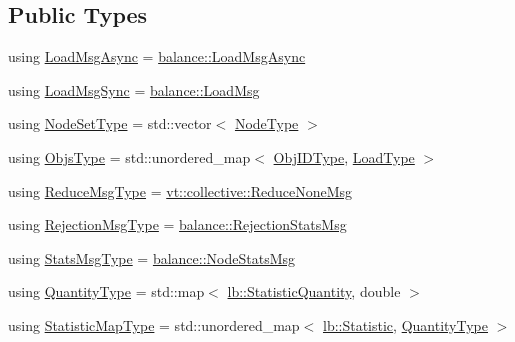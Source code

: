 \subsection*{Public Types}
\begin{DoxyCompactItemize}
\item 
using \hyperlink{structvt_1_1vrt_1_1collection_1_1lb_1_1_tempered_l_b_a38d9ad7e92612cdbdf564b6f49b516a7}{Load\+Msg\+Async} = \hyperlink{structvt_1_1vrt_1_1collection_1_1balance_1_1_load_msg_async}{balance\+::\+Load\+Msg\+Async}
\item 
using \hyperlink{structvt_1_1vrt_1_1collection_1_1lb_1_1_tempered_l_b_aa46eb8cbc4c505f35b970f75e38b5e0d}{Load\+Msg\+Sync} = \hyperlink{structvt_1_1vrt_1_1collection_1_1balance_1_1_load_msg}{balance\+::\+Load\+Msg}
\item 
using \hyperlink{structvt_1_1vrt_1_1collection_1_1lb_1_1_tempered_l_b_aa18a0edaf10119e307e7209371caa673}{Node\+Set\+Type} = std\+::vector$<$ \hyperlink{namespacevt_a866da9d0efc19c0a1ce79e9e492f47e2}{Node\+Type} $>$
\item 
using \hyperlink{structvt_1_1vrt_1_1collection_1_1lb_1_1_tempered_l_b_ad54faf59319f1b33dec689ee853d688e}{Objs\+Type} = std\+::unordered\+\_\+map$<$ \hyperlink{structvt_1_1vrt_1_1collection_1_1lb_1_1_base_l_b_a790b22acf448880599724749cdc4e9b3}{Obj\+I\+D\+Type}, \hyperlink{structvt_1_1vrt_1_1collection_1_1lb_1_1_base_l_b_a215e22b9f12678303f49615ae3be05cc}{Load\+Type} $>$
\item 
using \hyperlink{structvt_1_1vrt_1_1collection_1_1lb_1_1_tempered_l_b_a3e688a286b16334d43666bae581231b7}{Reduce\+Msg\+Type} = \hyperlink{namespacevt_1_1collective_aa439a90f05078f2bcf918641c951946f}{vt\+::collective\+::\+Reduce\+None\+Msg}
\item 
using \hyperlink{structvt_1_1vrt_1_1collection_1_1lb_1_1_tempered_l_b_af1c8105006c9150e33347c66018e143e}{Rejection\+Msg\+Type} = \hyperlink{structvt_1_1vrt_1_1collection_1_1balance_1_1_rejection_stats_msg}{balance\+::\+Rejection\+Stats\+Msg}
\item 
using \hyperlink{structvt_1_1vrt_1_1collection_1_1lb_1_1_tempered_l_b_a59e5358a716ab79ac33c552cba9033f9}{Stats\+Msg\+Type} = \hyperlink{structvt_1_1vrt_1_1collection_1_1balance_1_1_node_stats_msg}{balance\+::\+Node\+Stats\+Msg}
\item 
using \hyperlink{structvt_1_1vrt_1_1collection_1_1lb_1_1_tempered_l_b_aea04b60ba909fbd4ec49d1d9f9fb632c}{Quantity\+Type} = std\+::map$<$ \hyperlink{namespacevt_1_1vrt_1_1collection_1_1lb_a74989c7b4dd16fcc067e90a29cd1febe}{lb\+::\+Statistic\+Quantity}, double $>$
\item 
using \hyperlink{structvt_1_1vrt_1_1collection_1_1lb_1_1_tempered_l_b_ad9f4a2ede0929ca64fc6108cc812db33}{Statistic\+Map\+Type} = std\+::unordered\+\_\+map$<$ \hyperlink{namespacevt_1_1vrt_1_1collection_1_1lb_af0e20ef9afee77295053aa83bf1348b1}{lb\+::\+Statistic}, \hyperlink{structvt_1_1vrt_1_1collection_1_1lb_1_1_base_l_b_a864b2c437d81680577013741e265ef0d}{Quantity\+Type} $>$
\end{DoxyCompactItemize}
